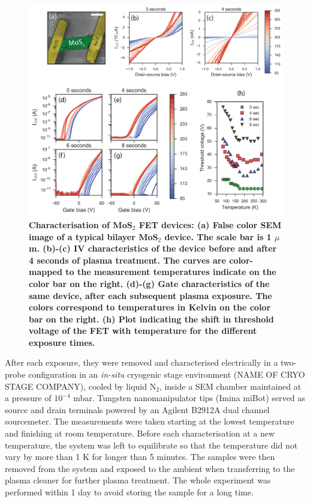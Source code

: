 \documentclass[%
 aip,
 jmp,%
 amsmath,amssymb,
 reprint,%
]{revtex4-1}
\begin{document}
{\setlength\intextsep{5pt}
\begin{figure}
\centering
\includegraphics[width=\columnwidth]{Figs_1.png}
\caption{{\footnotesize \textbf{Characterisation of MoS$_2$ FET devices: (a) False color SEM image of a typical bilayer MoS$_2$ device. The scale bar is 1 $\mu$m. (b)-(c) IV characteristics of the device before and after 4 seconds of plasma treatment. The curves are color-mapped to the measurement temperatures indicate on the color bar on the right. (d)-(g) Gate characteristics of the same device, after each subsequent plasma exposure. The colors correspond to temperatures in Kelvin on the color bar on the right. (h) Plot indicating the shift in threshold voltage of the FET with temperature for the different exposure times. }}}
\label{fig:electrical}
\end{figure}}
After each exposure, they were removed and characterised electrically in a two-probe configuration in an \textit{in-situ} cryogenic stage environment (NAME OF CRYO STAGE COMPANY), cooled by liquid N$_2$, inside a SEM chamber maintained at a pressure of $10^{-4}$ mbar. Tungsten nanomanipulator tips (Imina miBot) served as source and drain terminals powered by an Agilent B2912A dual channel sourcemeter. The measurements were taken starting at the lowest temperature and finishing at room temperature. Before each characterisation at a new temperature, the system was left to equilibrate so that the temperature did not vary by more than 1 K for longer than 5 minutes. The samples were then removed from the system and exposed to the ambient when transferring to the plasma cleaner for further plasma treatment. The whole experiment was performed within 1 day to avoid storing the sample for a long time. \newline
\end{document}
